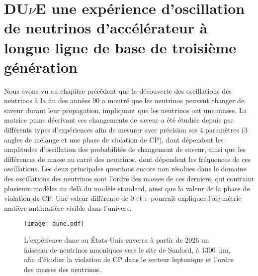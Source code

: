 

\chapter{\texorpdfstring{DU$\nu$E}{DUNE} une expérience d'oscillation de neutrinos d'accélérateur à longue ligne de base de troisième génération}

  Nous avons vu au chapitre précédent que la découverte des oscillations des neutrinos à la fin des années 90 a montré que les neutrinos peuvent changer de saveur durant leur propagation, impliquant que les neutrinos ont une masse. La matrice \gls{pmns} décrivant ces changements de saveur a été étudiée depuis par différents types d'expériences afin de mesurer avec précision ses 4 paramètres (3 angles de mélange et une phase de violation de CP), dont dépendent les amplitudes d'oscillation des probabilités de changement de saveur, ainsi que les différences de masse au carré des neutrinos, dont dépendent les fréquences de ces oscillations. Les deux principales questions encore non résolues dans le domaine des oscillations des neutrinos sont l'ordre des masses de ces derniers, qui contraint plusieurs modèles au delà du modèle standard, ainsi que la valeur de la phase de violation de CP. Une valeur différente de 0 et $\pi$ pourrait expliquer l'asymétrie matière-antimatière visible dans l'univers.

  \begin{figure}[htbp]
    \texttt{[image: dune.pdf]}
    \caption[L'expérience \acrshort{dune}]{\label{fig::dune}L'expérience \acrshort{dune} au États-Unis enverra à partir de 2026 un faisceau de neutrinos muoniques vers le site de Sanford, à \SI{1300}{\kilo\meter}, afin d'étudier la violation de CP dans le secteur leptonique et l'ordre des masses des neutrinos.}
  \end{figure}

